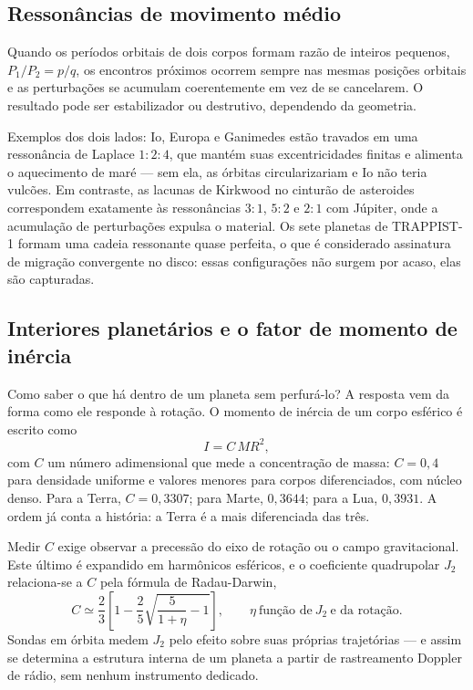 \documentclass[11pt,a4paper]{article}
\begin{document}
\subsection*{Ressonâncias de movimento médio}

Quando os períodos orbitais de dois corpos formam razão de inteiros pequenos, $P_1/P_2=p/q$, os encontros próximos ocorrem sempre nas mesmas posições orbitais e as perturbações se acumulam coerentemente em vez de se cancelarem. O resultado pode ser estabilizador ou destrutivo, dependendo da geometria.

Exemplos dos dois lados: Io, Europa e Ganimedes estão travados em uma ressonância de Laplace $1:2:4$, que mantém suas excentricidades finitas e alimenta o aquecimento de maré --- sem ela, as órbitas circularizariam e Io não teria vulcões. Em contraste, as lacunas de Kirkwood no cinturão de asteroides correspondem exatamente às ressonâncias $3:1$, $5:2$ e $2:1$ com Júpiter, onde a acumulação de perturbações expulsa o material. Os sete planetas de TRAPPIST-1 formam uma cadeia ressonante quase perfeita, o que é considerado assinatura de migração convergente no disco: essas configurações não surgem por acaso, elas são capturadas.

\subsection*{Interiores planetários e o fator de momento de inércia}

Como saber o que há dentro de um planeta sem perfurá-lo? A resposta vem da forma como ele responde à rotação. O momento de inércia de um corpo esférico é escrito como
\[
I=C\,M R^{2},
\]
com $C$ um número adimensional que mede a concentração de massa: $C=0{,}4$ para densidade uniforme e valores menores para corpos diferenciados, com núcleo denso. Para a Terra, $C=0{,}3307$; para Marte, $0{,}3644$; para a Lua, $0{,}3931$. A ordem já conta a história: a Terra é a mais diferenciada das três.

Medir $C$ exige observar a precessão do eixo de rotação ou o campo gravitacional. Este último é expandido em harmônicos esféricos, e o coeficiente quadrupolar $J_2$ relaciona-se a $C$ pela fórmula de Radau-Darwin,
\[
C\simeq\frac{2}{3}\left[1-\frac{2}{5}\sqrt{\frac{5}{1+\eta}-1}\right],
\qquad
\eta\ \text{função de}\ J_2\ \text{e da rotação}.
\]
Sondas em órbita medem $J_2$ pelo efeito sobre suas próprias trajetórias --- e assim se determina a estrutura interna de um planeta a partir de rastreamento Doppler de rádio, sem nenhum instrumento dedicado.
\end{document}
